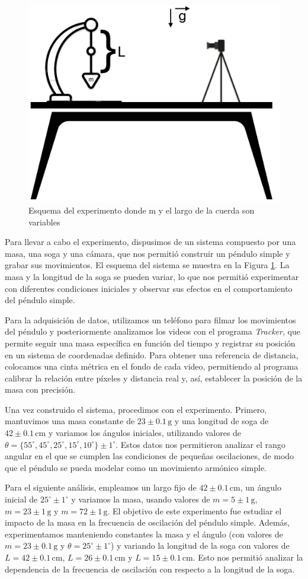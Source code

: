 \documentclass[12pt,a4]{article}
\begin{document}
\begin{figure}[H]
    \centering
    \includegraphics[width=0.6\linewidth]{esquema.png}
    \caption{Esquema del experimento donde m y el largo de la cuerda son variables}   
    \label{fig:esquema}
\end{figure}

Para llevar a cabo el experimento, dispusimos de un sistema compuesto por una masa, una soga y una cámara, que nos permitió construir un péndulo simple y grabar sus movimientos. El esquema del sistema se muestra en la Figura \ref{fig:esquema}. La masa y la longitud de la soga se pueden variar, lo que nos permitió experimentar con diferentes condiciones iniciales y observar sus efectos en el comportamiento del péndulo simple.

Para la adquisición de datos, utilizamos un teléfono para filmar los movimientos del péndulo y posteriormente analizamos los videos con el programa \textit{Tracker}, que permite seguir una masa específica en función del tiempo y registrar su posición en un sistema de coordenadas definido. Para obtener una referencia de distancia, colocamos una cinta métrica en el fondo de cada video, permitiendo al programa calibrar la relación entre píxeles y distancia real y, así, establecer la posición de la masa con precisión.

Una vez construido el sistema, procedimos con el experimento. Primero, mantuvimos una masa constante de $23 \pm 0.1 \, \text{g}$ y una longitud de soga de $42 \pm 0.1 \, \text{cm}$ y variamos los ángulos iniciales, utilizando valores de $\theta = \{55^\circ, 45^\circ, 25^\circ, 15^\circ, 10^\circ\} \pm 1^\circ$. Estos datos nos permitieron analizar el rango angular en el que se cumplen las condiciones de pequeñas oscilaciones, de modo que el péndulo se pueda modelar como un movimiento armónico simple.

Para el siguiente análisis, empleamos un largo fijo de $42 \pm 0.1 \, \text{cm}$, un ángulo inicial de $25^\circ \pm 1^\circ$ y variamos la masa, usando valores de $m = 5 \pm 1 \, \text{g}$, $m = 23 \pm 1 \, \text{g}$ y $m = 72 \pm 1 \, \text{g}$. El objetivo de este experimento fue estudiar el impacto de la masa en la frecuencia de oscilación del péndulo simple. Además, experimentamos manteniendo constantes la masa y el ángulo (con valores de $m = 23 \pm 0.1 \, \text{g}$ y $\theta = 25^\circ \pm 1^\circ$) y variando la longitud de la soga con valores de $L = 42 \pm 0.1 \, \text{cm}$, $L = 26 \pm 0.1 \, \text{cm}$ y $L = 15 \pm 0.1 \, \text{cm}$. Esto nos permitió analizar la dependencia de la frecuencia de oscilación con respecto a la longitud de la soga.
\end{document}
